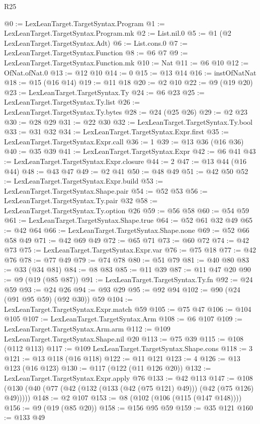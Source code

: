 \begin{lexlean}{R25}
\begin{coremodule}
@0 := LexLeanTarget.TargetSyntax.Program
@1 := LexLeanTarget.TargetSyntax.Program.mk
@2 := List.nil.{0}
@5 := @1 (@2 LexLeanTarget.TargetSyntax.Adt)
@6 := List.cons.{0}
@7 := LexLeanTarget.TargetSyntax.Function
@8 := @6 @7
@9 := LexLeanTarget.TargetSyntax.Function.mk
@10 := Nat
@11 := @6 @10
@12 := OfNat.ofNat.{0}
@13 := @12 @10
@14 := 0
@15 := @13 @14
@16 := instOfNatNat
@18 := @15 (@16 @14)
@19 := @11 @18
@20 := @2 @10
@22 := @9 (@19 @20)
@23 := LexLeanTarget.TargetSyntax.Ty
@24 := @6 @23
@25 := LexLeanTarget.TargetSyntax.Ty.list
@26 := LexLeanTarget.TargetSyntax.Ty.bytes
@28 := @24 (@25 @26)
@29 := @2 @23
@30 := @28 @29
@31 := @22 @30
@32 := LexLeanTarget.TargetSyntax.Ty.bool
@33 := @31 @32
@34 := LexLeanTarget.TargetSyntax.Expr.first
@35 := LexLeanTarget.TargetSyntax.Expr.call
@36 := 1
@39 := @13 @36 (@16 @36)
@40 := @35 @39
@41 := LexLeanTarget.TargetSyntax.Expr
@42 := @6 @41
@43 := LexLeanTarget.TargetSyntax.Expr.closure
@44 := 2
@47 := @13 @44 (@16 @44)
@48 := @43 @47
@49 := @2 @41
@50 := @48 @49
@51 := @42 @50
@52 := LexLeanTarget.TargetSyntax.Expr.build
@53 := LexLeanTarget.TargetSyntax.Shape.pair
@54 := @52 @53
@56 := LexLeanTarget.TargetSyntax.Ty.pair @32
@58 := LexLeanTarget.TargetSyntax.Ty.option @26
@59 := @56 @58
@60 := @54 @59
@61 := LexLeanTarget.TargetSyntax.Shape.true
@64 := @52 @61 @32 @49
@65 := @42 @64
@66 := LexLeanTarget.TargetSyntax.Shape.none
@69 := @52 @66 @58 @49
@71 := @42 @69 @49
@72 := @65 @71
@73 := @60 @72
@74 := @42 @73
@75 := LexLeanTarget.TargetSyntax.Expr.var
@76 := @75 @18
@77 := @42 @76
@78 := @77 @49
@79 := @74 @78
@80 := @51 @79
@81 := @40 @80
@83 := @33 (@34 @81)
@84 := @8 @83
@85 := @11 @39
@87 := @11 @47 @20
@90 := @9 (@19 (@85 @87))
@91 := LexLeanTarget.TargetSyntax.Ty.fn
@92 := @24 @59
@93 := @24 @26
@94 := @93 @29
@95 := @92 @94
@102 := @90 (@24 (@91 @95 @59) (@92 @30)) @59
@104 := LexLeanTarget.TargetSyntax.Expr.match @59
@105 := @75 @47
@106 := @104 @105
@107 := LexLeanTarget.TargetSyntax.Arm
@108 := @6 @107
@109 := LexLeanTarget.TargetSyntax.Arm.arm
@112 := @109 LexLeanTarget.TargetSyntax.Shape.nil @20
@113 := @75 @39
@115 := @108 (@112 @113)
@117 := @109 LexLeanTarget.TargetSyntax.Shape.cons
@118 := 3
@121 := @13 @118 (@16 @118)
@122 := @11 @121
@123 := 4
@126 := @13 @123 (@16 @123)
@130 := @117 (@122 (@11 @126 @20))
@132 := LexLeanTarget.TargetSyntax.Expr.apply @76
@133 := @42 @113
@147 := @108 (@130 (@40 (@77 (@42 (@132 (@133 (@42 (@75 @121) @49))) (@42 (@75 @126) @49)))))
@148 := @2 @107
@153 := @8 (@102 (@106 (@115 (@147 @148))))
@156 := @9 (@19 (@85 @20))
@158 := @156 @95 @59
@159 := @35 @121
@160 := @133 @49

\end{coremodule}
\end{lexlean}
